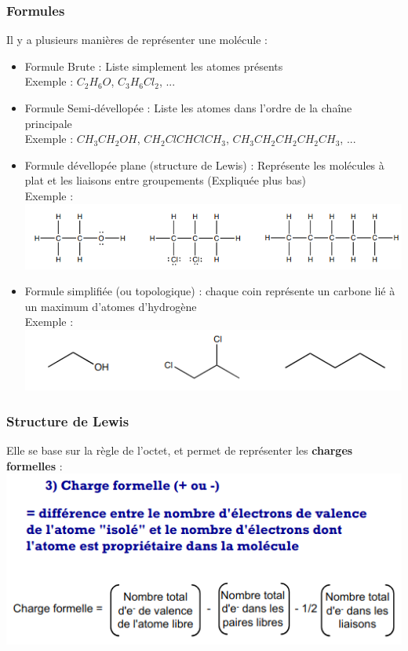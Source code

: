 \documentclass{article}
\begin{document}
        \subsubsection{Formules}
            Il y a plusieurs manières de représenter une molécule :
            \begin{itemize}
                \item Formule Brute : Liste simplement les atomes présents \\
                Exemple : $C_2 H_6 O$, $C_3 H_6 Cl_2$, ... 
                \item Formule Semi-dévellopée : Liste les atomes dans l'ordre de la chaîne principale \\
                Exemple : $CH_3CH_2OH$, $CH_2ClCHClCH_3$, $CH_3CH_2CH_2CH_2CH_3$, ... 
                \item Formule dévellopée plane (structure de Lewis) : Représente les molécules à plat et les liaisons entre groupements (Expliquée plus bas)\\
                Exemple :\\
                \includegraphics[scale=.6]{structures_planes.png}
                \item Formule simplifiée (ou topologique) : chaque coin représente un carbone lié à un maximum d'atomes d'hydrogène \\
                Exemple :\\
                \includegraphics[scale=.8]{formule_topologique.png}
            \end{itemize}
        
        \subsubsection{Structure de Lewis}
            Elle se base sur la règle de l'octet, et permet de représenter les \textbf{charges formelles} : \\
            \includegraphics[scale = .8]{charge_formelle.png}
\end{document}
